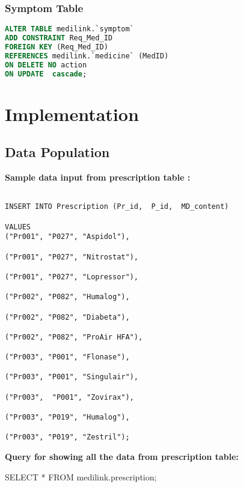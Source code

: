 \documentclass[11pt]{article}
\begin{document}
\subsubsection{Symptom Table}
\begin{lstlisting}[language=SQL]
ALTER TABLE medilink.`symptom`
ADD CONSTRAINT Req_Med_ID  
FOREIGN KEY (Req_Med_ID)
REFERENCES medilink.`medicine` (MedID)
ON DELETE NO action
ON UPDATE  cascade;
\end{lstlisting}






\section{Implementation}
\subsection{Data 
Population} 
\textbf{Sample data input from prescription table :}
\newline
\newline
\begin{lstlisting}
    
INSERT INTO Prescription (Pr_id,  P_id,  MD_content)

VALUES
("Pr001", "P027", "Aspidol"),

("Pr001", "P027", "Nitrostat"),

("Pr001", "P027", "Lopressor"),

("Pr002", "P082", "Humalog"),

("Pr002", "P082", "Diabeta"),

("Pr002", "P082", "ProAir HFA"),

("Pr003", "P001", "Flonase"),

("Pr003", "P001", "Singulair"),

("Pr003",  "P001", "Zovirax"),

("Pr003", "P019", "Humalog"),

("Pr003", "P019", "Zestril");

\end{lstlisting}
\newline
\newline

\textbf{ Query for showing all the data from prescription table:} 

SELECT * FROM medilink.prescription;
\newline
\newline
\end{document}
